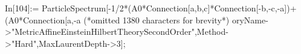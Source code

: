 In[104]:= ParticleSpectrum[-1/2*(A0*Connection[a,b,c]*Connection[-b,-c,-a])+(A0*Connection[a,-a (*omitted 1380 characters for brevity*) oryName->"MetricAffineEinsteinHilbertTheorySecondOrder",Method->"Hard",MaxLaurentDepth->3];